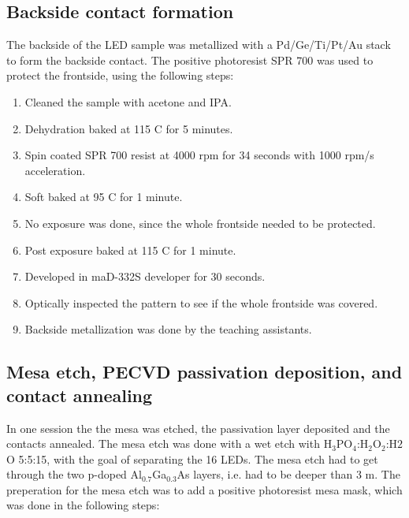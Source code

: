 \subsection{Backside contact formation}
\label{methods:backside_metallization}
The backside of the LED sample was metallized with a Pd/Ge/Ti/Pt/Au stack to form the backside contact.
The positive photoresist SPR 700 was used to protect the frontside, using the following steps:
\begin{enumerate}
    \item Cleaned the sample with acetone and IPA.
    \item Dehydration baked at 115 \textdegree C for 5 minutes.
    \item Spin coated SPR 700 resist at 4000 rpm for 34 seconds with 1000 rpm/s acceleration.
    \item Soft baked at 95 \textdegree C for 1 minute.
    \item No exposure was done, since the whole frontside needed to be protected.
    \item Post exposure baked at 115 \textdegree C for 1 minute.
    \item Developed in maD-332S developer for 30 seconds.
    \item Optically inspected the pattern to see if the whole frontside was covered.
    \item Backside metallization was done by the teaching assistants.
\end{enumerate}


\subsection{Mesa etch, PECVD passivation deposition, and contact annealing}
\label{methods:PECVD}
In one session the the mesa was etched, the passivation layer deposited and the contacts annealed.
The mesa etch was done with a wet etch with H$_3$PO$_4$:H$_2$O$_2$:H$2$O 5:5:15, with the goal of separating the 16 LEDs.
The mesa etch had to get through the two p-doped Al$_{0.7}$Ga$_{0.3}$As layers, i.e. had to be deeper than 3 \textmu m.
The preperation for the mesa etch was to add a positive photoresist mesa mask, which was done in the following steps:

